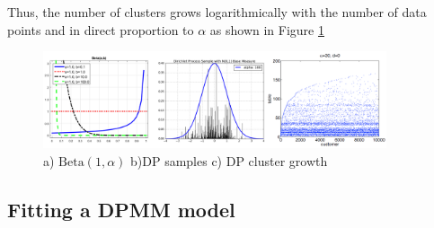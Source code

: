 Thus, the number of clusters grows logarithmically with the number of data points and in direct proportion to $\alpha$ as shown in Figure \ref{fig:dpmm_merged1} 
\begin{figure}[thpb]
    \centering
    \includegraphics[width=0.9\textwidth, trim={10 10 10 10}]{figures/dp_merged1.png}
    \caption{a) $\mathrm{Beta}(1,\alpha)$ b)DP samples c) DP cluster growth }
    \label{fig:dpmm_merged1}
\end{figure}

\subsection{Fitting a DPMM model}

